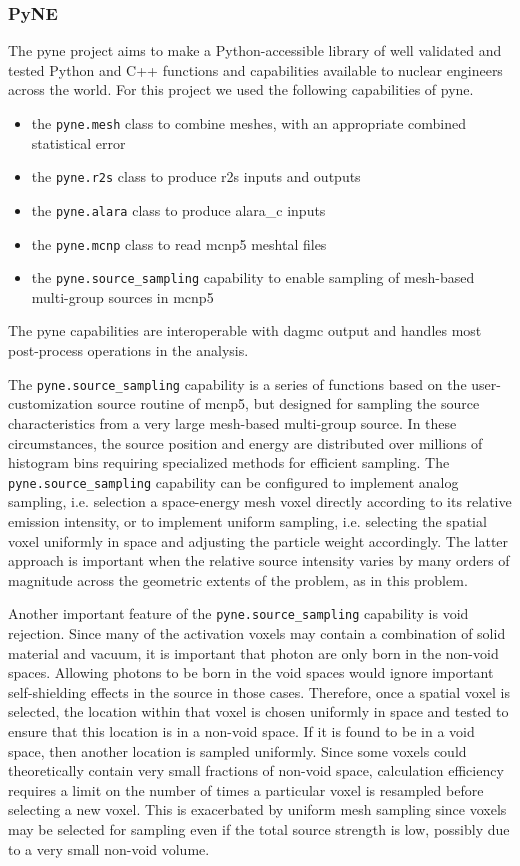 \documentclass[12pt]{article}
\begin{document}
\subsubsection{PyNE}
The \gls{pyne} \cite{Scopatz2012b} project aims to
make a Python-accessible library of well validated and tested
Python and C++ functions and capabilities available to nuclear engineers 
across the world.
For this project we used the following capabilities of \gls{pyne}.
\begin{itemize}
  \item{the \texttt{pyne.mesh} class to combine meshes, with an appropriate
        combined statistical error}
  \item{the \texttt{pyne.r2s} class to produce \gls{r2s} inputs and outputs}
  \item{the \texttt{pyne.alara} class to produce \gls{alara_c} inputs}
  \item{the \texttt{pyne.mcnp} class to read \gls{mcnp5} meshtal files}
  \item{the \texttt{pyne.source\_sampling} capability to enable sampling of 
        mesh-based multi-group sources in \gls{mcnp5} }
\end{itemize}
The \gls{pyne} capabilities are interoperable with \gls{dagmc} output and handles
most post-process operations in the analysis.

The \texttt{pyne.source\_sampling} capability is a series of functions based on
the user-customization source routine of \gls{mcnp5}, but designed for sampling
the source characteristics from a very large mesh-based multi-group source.  In
these circumstances, the source position and energy are distributed over millions
of histogram bins requiring specialized methods for efficient sampling.  The
\texttt{pyne.source\_sampling} capability can be configured to implement analog
sampling, i.e. selection a space-energy mesh voxel directly according to its
relative emission intensity, or to implement uniform sampling, i.e. selecting the
spatial voxel uniformly in space and adjusting the particle weight accordingly.
The latter approach is important when the relative source intensity varies by
many orders of magnitude across the geometric extents of the problem, as in 
this problem.

Another important feature of the \texttt{pyne.source\_sampling} capability is
void rejection.  Since many of the activation voxels may contain a combination
of solid material and vacuum, it is important that photon are only born in the
non-void spaces.  Allowing photons to be born in the void spaces would ignore
important self-shielding effects in the source in those cases.  Therefore,
once a spatial voxel is selected, the location within that voxel is chosen
uniformly in space and tested to ensure that this location is in a non-void
space.  If it is found to be in a void space, then another location is sampled
uniformly.  Since some voxels could theoretically contain very small fractions
of non-void space, calculation efficiency requires a limit on the number of
times a particular voxel is resampled before selecting a new voxel. This is
exacerbated by uniform mesh sampling since voxels may be selected for sampling
even if the total source strength is low, possibly due to a very small
non-void volume.
\end{document}
